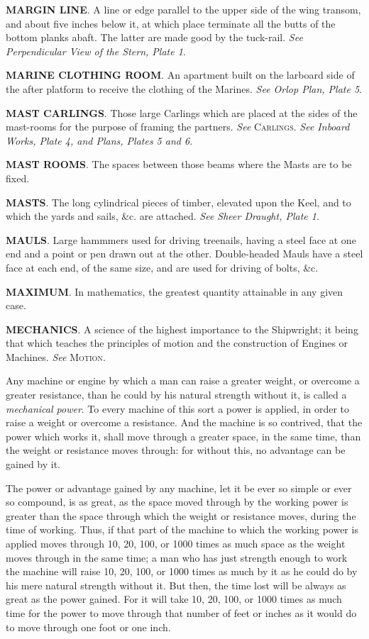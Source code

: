 \textbf{MARGIN LINE}. A line or edge parallel to the upper side of the wing transom, and about five inches below it, at which place terminate all the butts of the bottom planks abaft. The latter are made good by the tuck-rail. \textit{See Perpendicular View of the Stern, Plate 1}. 

\textbf{MARINE CLOTHING ROOM}. An apartment built on the larboard side of the after platform to receive the clothing of the Marines. \textit{See Orlop Plan, Plate 5}. 

\textbf{MAST CARLINGS}. Those large Carlings which are placed at the sides of the mast-rooms for the purpose of framing the partners. \textit{See} \textsc{Carlings}. \textit{See Inboard Works, Plate 4, and Plans, Plates 5 and 6}. 

\textbf{MAST ROOMS}. The spaces between those beams where the Masts are to be fixed. 

\textbf{MASTS}. The long cylindrical pieces of timber, elevated upon the Keel, and to which the yards and sails, \&c. are attached. \textit{See Sheer Draught, Plate 1}. 

\textbf{MAULS}. Large hammmers used for driving treenails, having a steel face at one end and a point or pen drawn out at the other. Double-headed Mauls have a steel face at each end, of the same size, and are used for driving of bolts, \&c. 

\textbf{MAXIMUM}. In mathematics, the greatest quantity attainable in any given case. 

\textbf{MECHANICS}. A science of the highest importance to the Shipwright; it being that which teaches the principles of motion and the construction of Engines or Machines. \textit{See} \textsc{Motion}. 

Any machine or engine by which a man can raise a greater weight, or overcome a greater resistance, than he could by his natural strength without it, is called a \textit{mechanical power}. To every machine of this sort a power is applied, in order to raise a weight or overcome a resistance. And the machine is so contrived, that the power which works it, shall move through a greater space, in the same time, than the weight or resistance moves through: for without this, no advantage can be gained by it. 

The power or advantage gained by any machine, let it be ever so simple or ever so compound, is as great, as the space moved through by the working power is greater than the space through which the weight or resistance moves, during the time of working. Thus, if that part of the machine to which the working power is applied moves through 10, 20, 100, or 1000 times as much space as the weight moves through in the same time; a man who has just strength enough to work the machine will raise 10, 20, 100, or 1000 times as much by it as he could do by his mere natural strength without it. But then, the time lost will be always as great as the power gained. For it will take 10, 20, 100, or 1000 times as much time for the power to move through that number of feet or inches as it would do to move through one foot or one inch. 

